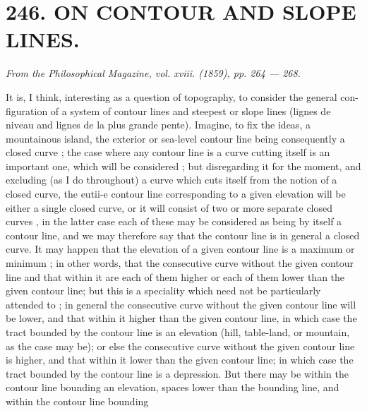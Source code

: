 \documentclass[11pt,a4paper]{book}
\begin{document}
\newpage

\section*{246. ON    CONTOUR   AND    SLOPE    LINES.}
\begin{flushright}
\textit{From  the  Philosophical  Magazine,  vol.  xviii.  (1859),  pp.  264 — 268.}\n\end{flushright}
\vspace{0.5em}
It  is,  I  think,  interesting  as  a  question  of  topography,  to  consider  the  general  con-
figuration of  a  system  of  contour  lines  and  steepest  or  slope  lines  (lignes  de  niveau
and  lignes  de  la  plus  grande  pente).  Imagine,  to  fix  the  ideas,  a  mountainous  island,
the  exterior  or  sea-level  contour  line  being  consequently  a  closed  curve ;  the  case  where
any  contour  line  is  a  curve  cutting  itself  is  an  important  one,  which  will  be  considered  ;
but  disregarding  it  for  the  moment,  and  excluding  (as  I  do  throughout)  a  curve  which
cuts  itself  from  the  notion  of  a  closed  curve,  the  eutii-e  contour  line  corresponding  to
a  given  elevation  will  be  either  a  single  closed  curve,  or  it  will  consist  of  two  or
more  separate  closed  curves ,  in  the  latter  case  each  of  these  may  be  considered  as
being  by  itself  a  contour  line,  and  we  may  therefore  say  that  the  contour  line  is  in
general  a  closed  curve.  It  may  happen  that  the  elevation  of  a  given  contour  line  is
a  maximum  or  minimum ;  in  other  words,  that  the  consecutive  curve  without  the
given  contour  line  and  that  within  it  are  each  of  them  higher  or  each  of  them  lower
than  the  given  contour  line;  but  this  is  a  speciality  which  need  not  be  particularly
attended  to ;  in  general  the  consecutive  curve  without  the  given  contour  line  will  be
lower,  and  that  within  it  higher  than  the  given  contour  line,  in  which  case  the  tract
bounded  by  the  contour  line  is  an  elevation  (hill,  table-land,  or  mountain,  as  the  case
may  be);  or  else  the  consecutive  curve  without  the  given  contour  line  is  higher,  and
that  within  it  lower  than  the  given  contour  line;  in  which  case  the  tract  bounded  by
the  contour  line  is  a  depression.  But  there  may  be  within  the  contour  line  bounding
an  elevation,  spaces  lower  than  the  bounding  line,  and  within  the  contour  line  bounding
\end{document}
